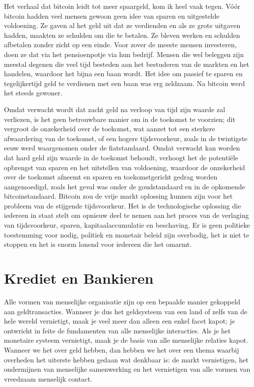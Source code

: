 \documentclass[
  a5paper,
  smalldemyvopaper,11pt,twoside,onecolumn,openright,extrafontsizes,
hidelinks]{memoir}
\begin{document}
Het verhaal dat bitcoin leidt tot meer spaargeld, kom ik heel vaak
tegen. Vóór bitcoin hadden veel mensen gewoon geen idee van sparen en
uitgestelde voldoening. Ze gaven al het geld uit dat ze verdienden en
als ze grote uitgaven hadden, maakten ze schulden om die te betalen. Ze
bleven werken en schulden afbetalen zonder zicht op een einde. Voor
zover de meeste mensen investeren, doen ze dat via het pensioenpotje via
hun bedrijf. Mensen die wel beleggen zijn meestal degenen die veel tijd
besteden aan het bestuderen van de markten en het handelen, waardoor het
bijna een baan wordt. Het idee om passief te sparen en tegelijkertijd
geld te verdienen met een baan was erg zeldzaam. Na bitcoin werd het
steeds gewoner.

Omdat verwacht wordt dat zacht geld na verloop van tijd zijn waarde zal
verliezen, is het geen betrouwbare manier om in de toekomst te voorzien;
dit vergroot de onzekerheid over de toekomst, wat aanzet tot een
sterkere afwaardering van de toekomst, of een hogere tijdsvoorkeur,
zoals in de twintigste eeuw werd waargenomen onder de fiatstandaard.
Omdat verwacht kan worden dat hard geld zijn waarde in de toekomst
behoudt, verhoogt het de potentiële opbrengst van sparen en het
uitstellen van voldoening, waardoor de onzekerheid over de toekomst
afneemt en sparen en toekomstgericht gedrag worden aangemoedigd, zoals
het geval was onder de goudstandaard en in de opkomende
bitcoinstandaard. Bitcoin zou de vrije markt oplossing kunnen zijn voor
het probleem van de stijgende tijdsvoorkeur. Het is de technologische
oplossing die iedereen in staat stelt om opnieuw deel te nemen aan het
proces van de verlaging van tijdsvoorkeur, sparen, kapitaalaccumulatie
en beschaving. Er is geen politieke toestemming voor nodig, politiek en
monetair beleid zijn overbodig, het is niet te stoppen en het is enorm
lonend voor iedereen die het omarmt.

\chapter{Krediet en Bankieren}\label{sec-krediet-en-bankieren}

Alle vormen van menselijke organisatie zijn op een bepaalde manier
gekoppeld aan geldtransacties. Wanneer je dus het geldsysteem van een
land of zelfs van de hele wereld vernietigt, maak je veel meer dan
alleen een enkel facet kapot; je ontwricht in feite de fundamenten van
alle menselijke interacties. Als je het monetaire systeem vernietigt,
maak je de basis van alle menselijke relaties kapot. Wanneer we het over
geld hebben, dan hebben we het over een thema waarbij overheden het
uiterste hebben gedaan wat denkbaar is: de markt vernietigen, het
ondermijnen van menselijke samenwerking en het vernietigen van alle
vormen van vreedzaam menselijk contact.
\end{document}
